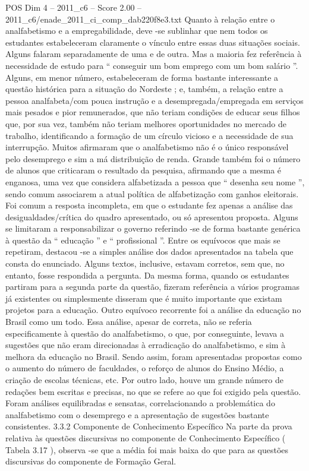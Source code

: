 \begin{textsample}{POS Dim 4 – 2011\_c6 – Score 2.00 – 2011\_c6/enade\_2011\_ci\_comp\_dab220f8e3.txt}
Quanto à relação entre o analfabetismo e a empregabilidade, deve -se sublinhar que nem todos os estudantes estabeleceram claramente o vínculo entre essas duas situações sociais.
Alguns falaram separadamente de uma e de outra.
Mas a maioria fez referência à necessidade de estudo para “ conseguir um bom emprego com um bom salário ”.
Alguns, em menor número, estabeleceram de forma bastante interessante a questão histórica para a situação do Nordeste ; e, também, a relação entre a pessoa analfabeta/com pouca instrução e a desempregada/empregada em serviços mais pesados e pior remunerados, que não teriam condições de educar seus filhos que, por sua vez, também não teriam melhores oportunidades no mercado de trabalho, identificando a formação de um círculo vicioso e a necessidade de sua interrupção.
Muitos afirmaram que o analfabetismo não é o único responsável pelo desemprego e sim a má distribuição de renda.
Grande também foi o número de alunos que criticaram o resultado da pesquisa, afirmando que a mesma é enganosa, uma vez que considera alfabetizada a pessoa que “ desenha seu nome ”, sendo comum associarem a atual política de alfabetização com ganhos eleitorais.
Foi comum a resposta incompleta, em que o estudante fez apenas a análise das desigualdades/crítica do quadro apresentado, ou só apresentou proposta.
Alguns se limitaram a responsabilizar o governo referindo -se de forma bastante genérica à questão da “ educação ” e “ profissional ”.
Entre os equívocos que mais se repetiram, destacou -se a simples análise dos dados apresentados na tabela que consta do enunciado.
Alguns textos, inclusive, estavam corretos, sem que, no entanto, fosse respondida a pergunta.
Da mesma forma, quando os estudantes partiram para a segunda parte da questão, fizeram referência a vários programas já existentes ou simplesmente disseram que é muito importante que existam projetos para a educação.
Outro equívoco recorrente foi a análise da educação no Brasil como um todo.
Essa análise, apesar de correta, não se referia especificamente à questão do analfabetismo, o que, por conseguinte, levava a sugestões que não eram direcionadas à erradicação do analfabetismo, e sim à melhora da educação no Brasil.
Sendo assim, foram apresentadas propostas como o aumento do número de faculdades, o reforço de alunos do Ensino Médio, a criação de escolas técnicas, etc.
Por outro lado, houve um grande número de redações bem escritas e precisas, no que se refere ao que foi exigido pela questão.
Foram análises equilibradas e sensatas, correlacionando a problemática do analfabetismo com o desemprego e a apresentação de sugestões bastante consistentes. 3.3.2 Componente de Conhecimento Específico Na parte da prova relativa às questões discursivas no componente de Conhecimento Específico ( Tabela 3.17 ), observa -se que a média foi mais baixa do que para as questões discursivas do componente de Formação Geral.

\end{textsample}
